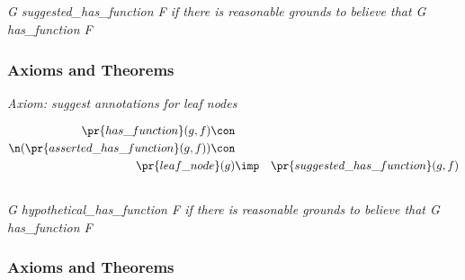\subsection*{ }
\emph{G suggested\_has\_function F if there is reasonable grounds to believe that G has\_function F}

\subsubsection*{Axioms and Theorems}

\emph{Axiom: suggest annotations for leaf nodes}

\begin{eqnarray*}
 \pr{has\_function}(g, f) \con \\
 \n( \pr{asserted\_has\_function}(g, f) )\con \\
 \pr{leaf\_node}(g) &\imp & \pr{suggested\_has\_function}(g, f) 
\end{eqnarray*}
\subsection*{ }
\emph{G hypothetical\_has\_function F if there is reasonable grounds to believe that G has\_function F}

\subsubsection*{Axioms and Theorems}

